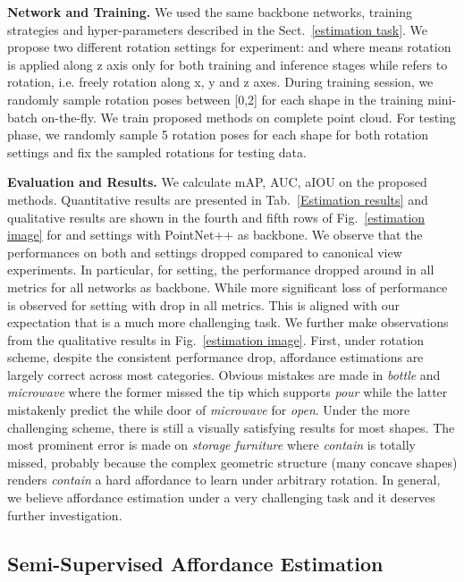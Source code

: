 \documentclass[final]{cvpr}
\begin{document}
\noindent\textbf{Network and Training.} We used the same backbone networks, training strategies and hyper-parameters described in the Sect.~\ref{estimation task}. We propose two different rotation settings for experiment:  and  where  means rotation is applied along z axis only for both training and inference stages while  refers to  rotation, i.e. freely rotation along x, y and z axes. During training session, we randomly sample rotation poses between [0,2] for each shape in the training mini-batch on-the-fly. We train proposed methods on complete point cloud. For testing phase, we randomly sample 5 rotation poses for each shape for both rotation settings and fix the sampled rotations for testing data.

\noindent\textbf{Evaluation and Results.} We calculate mAP, AUC, aIOU on the proposed methods. Quantitative results are presented in Tab.~\ref{Estimation results} and qualitative results are shown in the fourth and fifth rows of Fig.~\ref{estimation image} for  and  settings with PointNet++ as backbone. We observe that the performances on both  and  settings dropped compared to canonical view experiments. In particular, for  setting, the performance dropped around  in all metrics for all networks as backbone. While more significant loss of performance is observed for  setting with  drop in all metrics. This is aligned with our expectation that  is a much more challenging task. We further make observations from the qualitative results in Fig.~\ref{estimation image}. First, under  rotation scheme, despite the consistent performance drop, affordance estimations are largely correct across most categories. Obvious mistakes are made in \textit{bottle} and \textit{microwave} where the former missed the tip which supports \textit{pour} while the latter mistakenly predict the while door of \textit{microwave} for \textit{open}. Under the more challenging  scheme, there is still a visually satisfying results for most shapes. The most prominent error is made on \textit{storage furniture} where \textit{contain} is totally missed, probably because the complex geometric structure (many concave shapes) renders \textit{contain} a hard affordance to learn under arbitrary rotation.
In general, we believe affordance estimation under  a very challenging task and it deserves further investigation.




\subsection{Semi-Supervised Affordance Estimation}
\end{document}
